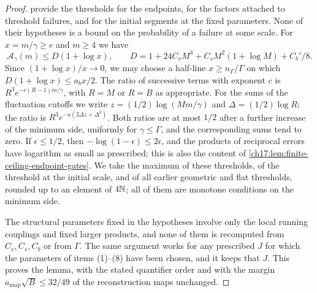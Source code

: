\begin{proof}
 provide the thresholds for the endpoints, for the factors attached to threshold failures, and for the initial segments at the fixed parameters. None of their hypotheses is a bound on the probability of a failure at some scale. For $x=m/\gamma\ge e$ and $m\ge4$ we have
\[
 \mathcal A_\gamma(m)\le D(1+\log x),\qquad D=1+24C_vM^3+C_sM^2(1+\log M)+C_b'/8.
\]
Since $(1+\log x)/x\to0$, we may choose a half-line $x\ge n_\Gamma/\Gamma$ on which $D(1+\log x)\le a_bx/2$. The ratio of successive terms with exponent $c$ is $R^3e^{-c(R-1)m/\gamma}$, with $R=M$ or $R=B$ as appropriate. For the sums of the fluctuation cutoffs we write $z=(1/2)\log(Mm/\gamma)$ and $\Delta=(1/2)\log R$; the ratio is $R^3e^{-a(2\Delta z+\Delta^2)}$. Both ratios are at most $1/2$ after a further increase of the minimum side, uniformly for $\gamma\le\Gamma$, and the corresponding sums tend to zero. If $\epsilon\le1/2$, then $-\log(1-\epsilon)\le2\epsilon$, and the products of reciprocal errors have logarithm as small as prescribed; this is also the content of \cref{ch17:lem:finite-ceiling-endpoint-gates}. We take the maximum of these thresholds, of the threshold at the initial scale, and of all earlier geometric and flat thresholds, rounded up to an element of $4\mathbb N$; all of them are monotone conditions on the minimum side.

The structural parameters fixed in the hypotheses involve only the local running couplings and fixed larger products, and none of them is recomputed from $C_v,C_s,C_b$ or from $\Gamma$. The same argument works for any prescribed $J$ for which the parameters of items (1)--(8) have been chosen, and it keeps that $J$. This proves the lemma, with the stated quantifier order and with the margin $a_{\mathrm{map}}\sqrt B\le32/49$ of the reconstruction maps unchanged.
\end{proof}

